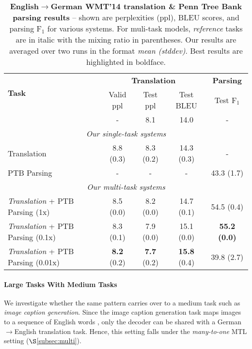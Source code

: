\begin{table}[tbh!]
\centering
\begin{tabular}{l|c|c|c|c}
\multirow{ 2}{*}{\bf{Task}} & \multicolumn{3}{c|}{{\bf Translation}} &
\multicolumn{1}{c}{{\bf
Parsing}}\\
  \cline{2-5}
  & Valid ppl & Test ppl & Test BLEU & Test F$_1$ \\
  \hline
\citep{luong15attn} & - & 8.1 & 14.0 & -  \\
  \hline
\multicolumn{5}{c}{{\it Our single-task systems}} \\
  \hline
Translation & 8.8 (0.3) & 8.3 (0.2) & 14.3 (0.3) & -\\
  \hline
PTB Parsing & - & - & - & 43.3 (1.7) \\
  \hline
\multicolumn{5}{c}{{\it Our multi-task systems}} \\
  \hline
{\it Translation} + PTB Parsing (1x) &  8.5 (0.0) & 8.2 (0.0) & 14.7 (0.1) & 54.5 (0.4) \\
  \hline
{\it Translation} + PTB Parsing (0.1x) &  8.3 (0.1) & 7.9 (0.0) & 15.1 (0.0) &
{\bf 55.2 (0.0)}\\
  \hline
{\it Translation} + PTB Parsing (0.01x) &  {\bf 8.2} (0.2) & {\bf 7.7} (0.2) & {\bf
15.8} (0.4) & 39.8 (2.7) \\
\end{tabular}
\caption[Translation \& Penn Tree Bank parsing
results]{{\bf English$\rightarrow$German WMT'14 translation \& Penn Tree Bank parsing results} --
shown are perplexities (ppl), BLEU scores, and parsing F$_1$ for various systems. For muli-task
models, {\it reference} tasks are in
italic with the mixing ratio in parentheses. Our results are averaged over two
runs
in the format {\it mean (stddev)}. Best results are
highlighted in boldface.}
\label{t:big_small}
\end{table}

\paragraph{Large Tasks With Medium Tasks} %
We investigate whether the same pattern carries over to a medium task
such as {\it image caption generation}. Since the image caption
generation task maps images to a sequence of
English words \citep{vinyals15caption,xu15}, only the decoder can be
shared with a German$\rightarrow$English translation task. Hence, this
setting falls under the {\it many-to-one} MTL setting ($\S$\ref{subsec:multi}).

